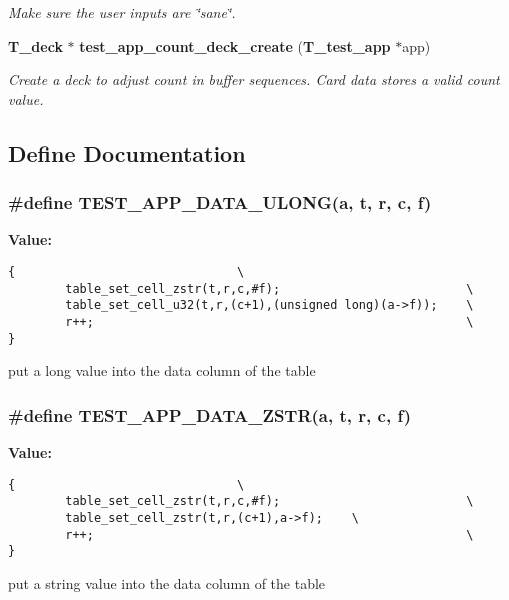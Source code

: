 \begin{CompactItemize}
\begin{CompactList}\small\item\em Make sure the user inputs are \char`\"{}sane\char`\"{}.\item\end{CompactList}\item 
{\bf T\_\-deck} $\ast$ {\bf test\_\-app\_\-count\_\-deck\_\-create} ({\bf T\_\-test\_\-app} $\ast$app)
\begin{CompactList}\small\item\em Create a deck to adjust count in buffer sequences. Card data stores a valid count value.\item\end{CompactList}\end{CompactItemize}


\subsection{Define Documentation}
\subsubsection{\setlength{\rightskip}{0pt plus 5cm}\#define TEST\_\-APP\_\-DATA\_\-ULONG(a, t, r, c, f)}\label{group__test__app_a11}


{\bf Value:}

\footnotesize\begin{verbatim}{                               \
        table_set_cell_zstr(t,r,c,#f);                          \
        table_set_cell_u32(t,r,(c+1),(unsigned long)(a->f));    \
        r++;                                                    \
}\end{verbatim}\normalsize 
put a long value into the data column of the table 
\subsubsection{\setlength{\rightskip}{0pt plus 5cm}\#define TEST\_\-APP\_\-DATA\_\-ZSTR(a, t, r, c, f)}\label{group__test__app_a12}


{\bf Value:}

\footnotesize\begin{verbatim}{                               \
        table_set_cell_zstr(t,r,c,#f);                          \
        table_set_cell_zstr(t,r,(c+1),a->f);    \
        r++;                                                    \
}\end{verbatim}\normalsize 
put a string value into the data column of the table 
